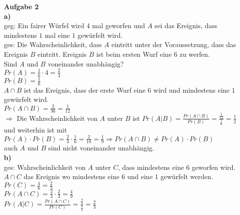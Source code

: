 \documentclass[a4paper]{scrartcl}
\begin{document}
	\begin{flushleft}
		\textbf{Aufgabe 2}\\
		\textbf{a)}\\
		geg: Ein fairer Würfel wird 4 mal geworfen und $A$ sei das Ereignis, dass mindestens $1$ mal eine $1$ gewürfelt wird.\\
		ges: Die Wahrscheinlichkeit, dass $A$ eintritt unter der Voraussetzung, dass das Ereignis $B$ eintritt. Ereignis $B$ ist beim ersten Wurf eine $6$ zu werfen.\\
		Sind $A$ und $B$ voneinander unabhängig?\\[1em]
		$Pr(A)=\frac{1}{6}\cdot 4=\frac{2}{3}$\\
		$Pr(B)=\frac{1}{6}$\\
		$A\cap B$ ist das Ereignis, dass der erste Wurf eine $6$ wird und mindestens eine $1$ gewürfelt wird.\\
		$Pr(A\cap B) = \frac{3}{36}=\frac{1}{12}$\\
		$\Rightarrow$ Die Wahrscheinlichkeit von $A$ unter $B$ ist $Pr(A|B)=\frac{Pr(A\cap B)}{Pr(B)}=\frac{\frac{1}{12}}{\frac{1}{6}}=\frac{1}{2}$ und weiterhin ist mit $Pr(A)\cdot Pr(B)=\frac{2}{3}\cdot \frac{1}{6}=\frac{2}{18}=\frac{1}{9} \Rightarrow Pr(A\cap B)\neq Pr(A)\cdot Pr(B)$\\
		auch $A$ und $B$ sind nicht voneinander unabhängig.\\[1em]
		\textbf{b)}\\
		ges: Wahrscheinlichkeit von $A$ unter $C$, dass mindestens eine $6$ geworfen wird.\\[1em]
		$A\cap C$ das Ereignis wo mindestens eine $6$ und eine $1$ gewürfelt werden.\\
		$Pr(C)=\frac{4}{6} =\frac{2}{3}$\\
		$Pr(A\cap C)=\frac{2}{3}\cdot\frac{2}{3}=\frac{4}{9}$\\
		$Pr(A|C)=\frac{Pr(A\cap C)}{Pr(C)}=\frac{\frac{4}{9}}{\frac{2}{3}}=\frac{2}{3}$\\[1em]
	\end{flushleft}
\end{document}
